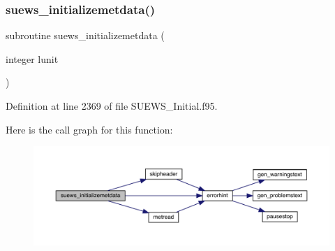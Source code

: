 \subsubsection{\texorpdfstring{suews\+\_\+initializemetdata()}{suews\_initializemetdata()}}
{\footnotesize\ttfamily subroutine suews\+\_\+initializemetdata (\begin{DoxyParamCaption}\item[{integer}]{lunit }\end{DoxyParamCaption})}



Definition at line 2369 of file S\+U\+E\+W\+S\+\_\+\+Initial.\+f95.

Here is the call graph for this function\+:\nopagebreak
\begin{figure}[H]
\begin{center}
\leavevmode
\includegraphics[width=350pt]{_s_u_e_w_s___initial_8f95_aecb9f7926254a01f8ea8e4f74fe2f6c1_cgraph}
\end{center}
\end{figure}
